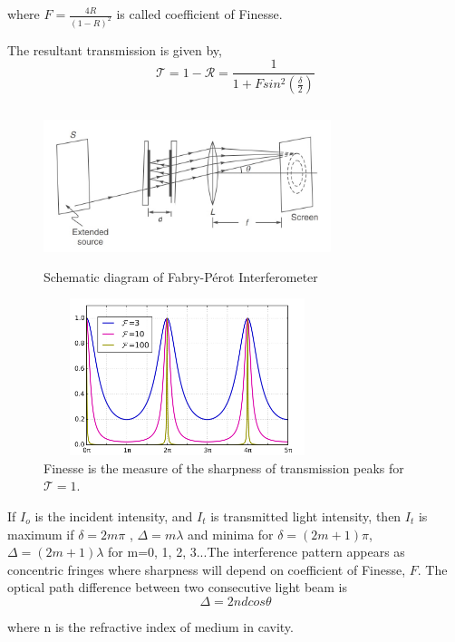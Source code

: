 \documentclass[a4paper, amsfonts, amssymb, amsmath, reprint, showkeys, nofootinbib, twoside]{revtex4-1}
\begin{document}
where $F=\frac{4R}{(1-R)^2}$ is called coefficient of Finesse.

The resultant transmission is given by, 
\begin{equation}
\mathcal{T}=1-\mathcal{R}=\frac{1}{1+Fsin^{2}(\frac{\delta}{2})}
\end{equation}

\begin{figure}[htbp] %
   \centering
   \includegraphics[width=3.3in, height=1.8in]{sc} 
   \caption{Schematic diagram of Fabry-Pérot Interferometer}
   \label{2}
\end{figure}

\begin{figure}[htbp] %
   \centering
   \includegraphics[width=3.3in, height=1.8in]{4} 
   \caption{Finesse is the measure of the sharpness of transmission peaks for $\mathcal{T}=1$.}
   \label{2}
\end{figure}

If $I_o$ is the incident intensity, and $I_t$ is transmitted light intensity, then $I_t$ is maximum if $\delta=2m\pi$ , $\Delta=m\lambda$ and minima for $\delta=(2m+1)\pi$, $\Delta=(2m+1)\lambda$ for m=0, 1, 2, 3...The interference pattern appears as concentric fringes where sharpness will depend on coefficient of Finesse, $F$. The optical path difference between two consecutive light beam is 
\begin{equation}
\Delta=2ndcos\theta
\end{equation}

where n is the refractive index of medium in cavity.
\end{document}
